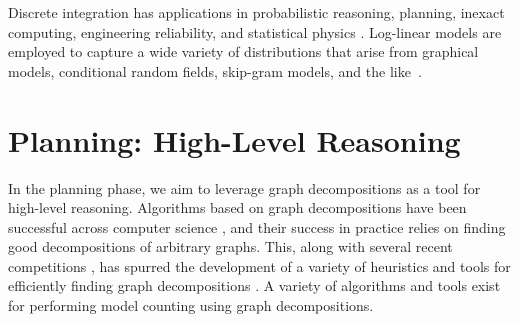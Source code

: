 



Discrete integration has applications in probabilistic reasoning, planning, inexact computing, engineering reliability, and statistical physics \cite{Bacchus2003,DH07,GSS08,naveh2007constraint}. Log-linear models are employed to capture a wide variety of distributions that arise from graphical models, conditional random fields, skip-gram models, and the like~\cite{KF09}.


\section{Planning: High-Level Reasoning}
In the planning phase, we aim to leverage graph decompositions as a tool for high-level reasoning.
Algorithms based on graph decompositions have been successful across computer science \cite{GLST17,MPPV04}, and their success in practice relies on finding good decompositions of arbitrary graphs. 
This, along with several recent competitions \cite{DKTW18}, has spurred the development of a variety of heuristics and tools for efficiently finding graph decompositions \cite{AMW17,HS18,Tamaki17,hicks02}. 
A variety of algorithms \cite{FMR08,SS10} and tools \cite{CW16,FHMW17,FHWZ18,FHZ19} exist for performing model counting using graph decompositions.

